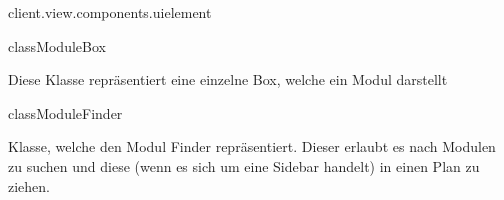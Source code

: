 \begin{texdocpackage}{client.view.components.uielement}
\label{texdoclet:edu.kit.informatik.studyplan.client.view.components.uielement}

\begin{texdocclass}{class}{ModuleBox}
\label{texdoclet:edu.kit.informatik.studyplan.client.view.components.uielement.ModuleBox}
\begin{texdocclassintro}
Diese Klasse repräsentiert eine einzelne Box, welche ein Modul darstellt\end{texdocclassintro}
\begin{texdocclassconstructors}
\end{texdocclassconstructors}
\begin{texdocclassmethods}
\end{texdocclassmethods}
\end{texdocclass}


\begin{texdocclass}{class}{ModuleFinder}
\label{texdoclet:edu.kit.informatik.studyplan.client.view.components.uielement.ModuleFinder}
\begin{texdocclassintro}
Klasse, welche den Modul Finder repräsentiert. Dieser erlaubt es nach Modulen
 zu suchen und diese (wenn es sich um eine Sidebar handelt) in einen Plan zu
 ziehen.\end{texdocclassintro}
\begin{texdocclassconstructors}
\end{texdocclassconstructors}
\begin{texdocclassmethods}
\end{texdocclassmethods}
\end{texdocclass}



\end{texdocpackage}
